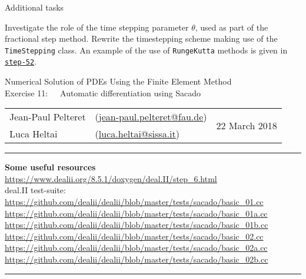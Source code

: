 \documentclass[11pt]{exam}
\makeatletter
\newcommand{\makeheader}[3]{%
\setcounter{question}{0}
\begin{center}
{\sc Numerical Solution of PDEs Using the Finite Element Method}\vspace{2ex}\\
{\sc Exercise #1:\ \ \ #2}\vspace{2ex}\\
\begin{tabular*}{\textwidth}{ll @{\extracolsep{\fill}}r}
Jean-Paul Pelteret & (\url{jean-paul.pelteret@fau.de}) & \multirow{2}{*}{#3} \\
Luca Heltai & (\url{luca.heltai@sissa.it}) & \\
\end{tabular*}
\end{center}
}
\newcommand{\makeresources}[1]{%
\rule{\textwidth}{0.6mm}
\textbf{Some useful resources}\\[1.5ex]
#1 \par
\rule{\textwidth}{0.6mm}
}
\makeatother
\begin{document}
\begin{questions}

\question Additional tasks
\begin{parts}
\bonuspart Investigate the role of the time stepping parameter $\theta$, used as part of the fractional step method.
\bonuspart Rewrite the timestepping scheme making use of the \verb|TimeStepping| class. An example of the use of \verb|RungeKutta| methods is given in \href{https://www.dealii.org/developer/doxygen/deal.II/step_52.html}{\texttt{step-52}}.
\end{parts}

\end{questions}




\clearpage
\makeheader{11}{Automatic differentiation using Sacado}{22 March 2018}
\makeresources{%
\url{https://www.dealii.org/8.5.1/doxygen/deal.II/step_6.html}\\
deal.II test-suite: \\
\url{https://github.com/dealii/dealii/blob/master/tests/sacado/basic_01.cc}\\
\url{https://github.com/dealii/dealii/blob/master/tests/sacado/basic_01a.cc}\\
\url{https://github.com/dealii/dealii/blob/master/tests/sacado/basic_01b.cc}\\
\url{https://github.com/dealii/dealii/blob/master/tests/sacado/basic_02.cc}\\
\url{https://github.com/dealii/dealii/blob/master/tests/sacado/basic_02a.cc}\\
\url{https://github.com/dealii/dealii/blob/master/tests/sacado/basic_02b.cc}
}
\end{document}
